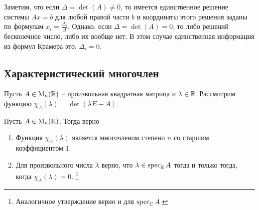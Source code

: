 Заметим, что если $\Delta = \det (A) \neq 0$, то имеется единственное решение системы $Ax = b$ для любой правой части $b$ и координаты этого решения заданы по формулам $x_i =\frac{\Delta_i}{\Delta}$.
Однако, если $\Delta = \det(A) = 0$, то либо решений бесконечное число, либо их вообще нет.
В этом случае единственная информация из формул Крамера это: $\Delta_i = 0$.


\subsection{Характеристический многочлен}

Пусть $A\in\operatorname{M}_{n}(\mathbb R)$ -- произвольная квадратная матрица и $\lambda \in\mathbb R$.
Рассмотрим функцию $\chi_A(\lambda) = \det(\lambda E - A)$.

\begin{claim}
\label{claim::CharSpec}
Пусть $A\in\operatorname{M}_{n}(\mathbb R)$.
Тогда верно
\begin{enumerate}
\item Функция $\chi_A(\lambda)$ является многочленом степени $n$ со старшим коэффициентом $1$.

\item Для произвольного числа $\lambda$ верно, что $\lambda \in\operatorname{spec}_\mathbb R A$ тогда и только тогда, когда $\chi_A(\lambda) = 0$.%
\footnote{Аналогичное утверждение верно и для $\operatorname{spec}_\mathbb C A$.}
\end{enumerate}
\end{claim}
